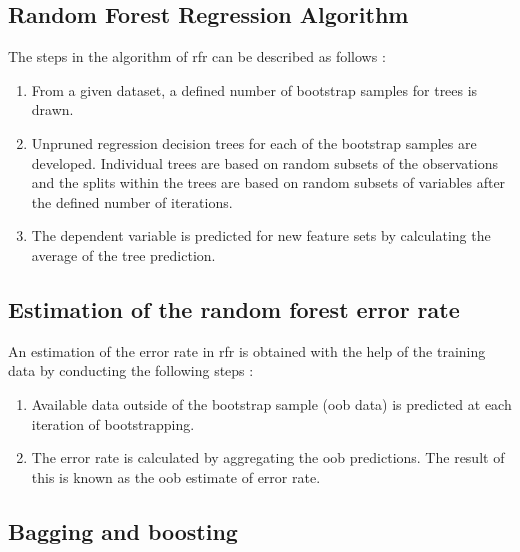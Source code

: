 \documentclass[a4paper, 11pt, oneside]{Thesis}  %
\begin{document}
\subsection{Random Forest Regression Algorithm}

The steps in the algorithm of \ac{rfr} can be described as follows \cite{Liaw.2002}:

\begin{enumerate}
\item	From a given dataset, a defined number of bootstrap samples for trees is drawn.
\item Unpruned regression decision trees for each of the bootstrap samples are developed. Individual trees are based on random subsets of the observations and the splits within the trees are based on random subsets of variables after the defined number of iterations.
\item The dependent variable is predicted for new feature sets by calculating the average of the tree prediction.
\end{enumerate}

\subsection{Estimation of the random forest error rate}
An estimation of the error rate in \ac{rfr} is obtained with the help of the training data by conducting the following steps \cite{Liaw.2002}:

\begin{enumerate}
\item Available data outside of the bootstrap sample (\ac{oob} data) is predicted at each iteration of bootstrapping.
\item The error rate is calculated by aggregating the \ac{oob} predictions. The result of this is known as the \ac{oob} estimate of error rate.
\end{enumerate}
 
\subsection{Bagging and boosting}
\end{document}
